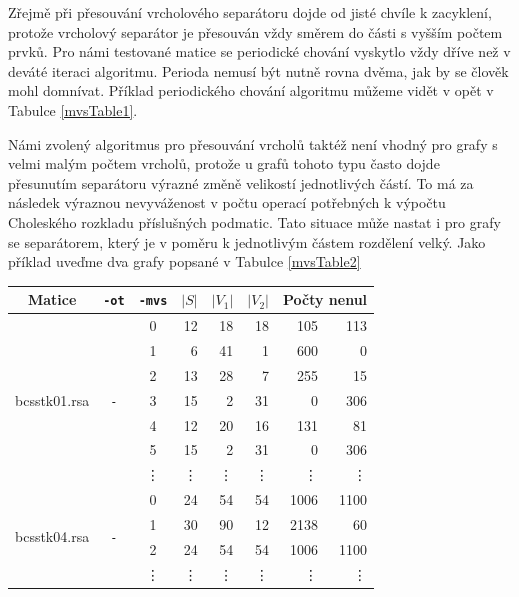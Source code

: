 \documentclass[11pt,american,czech,oneside]{book}
\theoremstyle{plain}
\theoremstyle{definition}
\begin{document}
Zřejmě při přesouvání vrcholového separátoru dojde od jisté chvíle k zacyklení, protože vrcholový separátor je přesouván vždy směrem do části s vyšším počtem prvků. Pro námi testované matice se periodické chování vyskytlo vždy dříve než v deváté iteraci algoritmu. Perioda nemusí být nutně rovna dvěma, jak by se člověk mohl domnívat. Příklad periodického chování algoritmu můžeme vidět v opět v Tabulce \ref{mvsTable1}.

Námi zvolený algoritmus pro přesouvání vrcholů taktéž není vhodný pro grafy s velmi malým počtem vrcholů, protože u grafů tohoto typu často dojde přesunutím separátoru výrazné změně velikostí jednotlivých částí. To má za následek výraznou nevyváženost v počtu operací potřebných k výpočtu Choleského rozkladu příslušných podmatic. Tato situace může nastat i pro grafy se separátorem, který je v poměru k jednotlivým částem rozdělení velký. Jako příklad uveďme dva grafy popsané v Tabulce \ref{mvsTable2}

\bigskip
{\noindent
  \footnotesize
  \centering
  \renewcommand{\arraystretch}{1.15}
\begin{tabular}{|l|c|c|r|r|r|r|r|}
  \hline
  \multicolumn{1}{|c|}{Matice} & \multicolumn{1}{|c|}{\texttt{-ot}}  &\multicolumn{1}{|c|}{\texttt{-mvs}} &\multicolumn{1}{|c|}{$|S|$} & \multicolumn{1}{|c|}{$|V_1|$}& \multicolumn{1}{|c|}{$|V_2|$} & \multicolumn{2}{c|}{Počty nenul} \\
  \hline
    \multirow{7}{*}{bcsstk01.rsa}
      & \multirow{7}{*}{\texttt{-}} & 0
      & 12 & 18 & 18 & 105 & 113 \\
      & & 1  
      &	6	&	41	&	1	&	600	&	0	\\
      & & 2
      &	13	&	28	&	7	&	255	&	15	\\
      & & 3
      &	15	&	2	&	31	&	0	&	306	\\
      & & 4
      &	12	&	20	&	16	&	131	&	81	\\
      & & 5
      &	15	&	2	&	31	&	0	&	306	\\
      & & \vdots
      &	\vdots	&	\vdots	&	\vdots	&	\vdots	&	\vdots	\\
    \hline
    \multirow{4}{*}{bcsstk04.rsa}
      & \multirow{4}{*}{\texttt{-}} & 0
      &	24	&	54	&	54	&	1006	&	1100	\\
      & & 1   
      &	30	&	90	&	12	&	2138	&	60	\\
      & & 2
      &	24	&	54	&	54	&	1006	&	1100	\\
      & & \vdots
      &	\vdots	&	\vdots	&	\vdots	&	\vdots	&	\vdots	\\
    \hline
\end{tabular}
}
\end{document}
